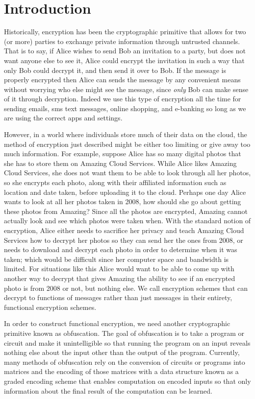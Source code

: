 \documentclass[12pt,twoside]{reedthesis}
\begin{document}
     \chapter*{Introduction}
	        Historically, encryption has been the cryptographic primitive that allows for two (or more) parties to exchange private information through untrusted channels. That is to say, if Alice wishes to send Bob an invitation to a party, but does not want anyone else to see it, Alice could encrypt the invitation in such a way that only Bob could decrypt it, and then send it over to Bob. If the message is properly encrypted then Alice can sends the message by any convenient means without worrying who else might see the message, since \textit{only} Bob can make sense of it through decryption. Indeed we use this type of encryption all the time for sending emails, sms text messages, online shopping, and e-banking so long as we are using the correct apps and settings.
	        \par However, in a world where individuals store much of their data on the cloud, the method of encryption just described might be either too limiting or give away too much information. For example, suppose Alice has so many digital photos that she has to store them on Amazing Cloud Services. While Alice likes Amazing Cloud Services, she does not want them to be able to look through all her photos, so she encrypts each photo, along with their affiliated information such as location and date taken, before uploading it to the cloud. Perhaps one day Alice wants to look at all her photos taken in 2008, how should she go about getting these photos from Amazing? Since all the photos are encrypted, Amazing cannot actually look and see which photos were taken when. With the standard notion of encryption, Alice either needs to sacrifice her privacy and teach Amazing Cloud Services how to decrypt her photos so they can send her the ones from 2008, or needs to download and decrypt each photo in order to determine when it was taken; which would be difficult since her computer space and bandwidth is limited. For situations like this Alice would want to be able to come up with another way to decrypt that gives Amazing the ability to see if an encrypted photo is from 2008 or not, but nothing else. We call encryption schemes that can decrypt to functions of messages rather than just messages in their entirety, functional encryption schemes.
	        \par In order to construct functional encryption, we need another cryptographic primitive known as obfuscation. The goal of obfuscation is to take a program or circuit and make it unintelligible so that running the program on an input reveals nothing else about the input other than the output of the program. Currently, many methods of obfuscation rely on the conversion of circuits or programs into matrices and the encoding of those matrices with a data structure known as a graded encoding scheme that enables computation on encoded inputs so that only information about the final result of the computation can be learned.
\end{document}
